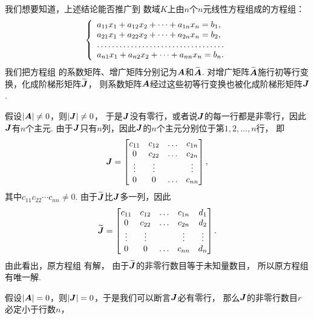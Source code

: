 我们想要知道，上述结论能否推广到
数域\(K\)上由\(n\)个\(n\)元线性方程组成的方程组：
\begin{equation}\label{equation:克拉默法则.线性方程组}
	\left\{ \begin{array}{l}
		a_{11}x_1 + a_{12}x_2 + \dotsb + a_{1n}x_n = b_1, \\
		a_{21}x_1 + a_{22}x_2 + \dotsb + a_{2n}x_n = b_2, \\
		\hdotsfor{1} \\
		a_{n1}x_1 + a_{n2}x_2 + \dotsb + a_{nn}x_n = b_n.
	\end{array} \right.
\end{equation}
我们把方程组  的系数矩阵、增广矩阵分别记为\(\boldsymbol{A}\)和\(\widetilde{\boldsymbol{A}}\).
对增广矩阵\(\widetilde{\boldsymbol{A}}\)施行初等行变换，化成阶梯形矩阵\(\widetilde{\boldsymbol{J}}\)，
则系数矩阵\(\boldsymbol{A}\)经过这些初等行变换也被化成阶梯形矩阵\(\boldsymbol{J}\).

假设\(\abs{\boldsymbol{A}}\neq0\)，则\(\abs{\boldsymbol{J}}\neq0\)，
于是\(\boldsymbol{J}\)没有零行，或者说\(\boldsymbol{J}\)的每一行都是非零行，因此\(\boldsymbol{J}\)有\(n\)个主元.
由于\(\boldsymbol{J}\)只有\(n\)列，因此\(\boldsymbol{J}\)的\(n\)个主元分别位于第\(1,2,\dotsc,n\)行，
即\begin{equation*}
	\boldsymbol{J} = \begin{bmatrix}
		c_{11} & c_{12} & \dots & c_{1n} \\
		0 & c_{22} & \dots & c_{2n} \\
		\vdots & \vdots & & \vdots \\
		0 & 0 & \dots & c_{nn}
	\end{bmatrix},
\end{equation*}
其中\(c_{11} c_{22} \dotsm c_{nn} \neq 0\).
由于\(\widetilde{\boldsymbol{J}}\)比\(\boldsymbol{J}\)多一列，因此\begin{equation*}
	\widetilde{\boldsymbol{J}} = \begin{bmatrix}
		c_{11} & c_{12} & \dots & c_{1n} & d_1 \\
		0 & c_{22} & \dots & c_{2n} & d_2 \\
		\vdots & \vdots & & \vdots & \vdots \\
		0 & 0 & \dots & c_{nn} & d_n
	\end{bmatrix}.
\end{equation*}
由此看出，原方程组  有解，
由于\(\widetilde{\boldsymbol{J}}\)的非零行数目等于未知量数目，
所以原方程组  有唯一解.

假设\(\abs{\boldsymbol{A}}=0\)，则\(\abs{\boldsymbol{J}}=0\)，于是我们可以断言\(\boldsymbol{J}\)必有零行，
那么\(\boldsymbol{J}\)的非零行数目\(r\)必定小于行数\(n\)，

